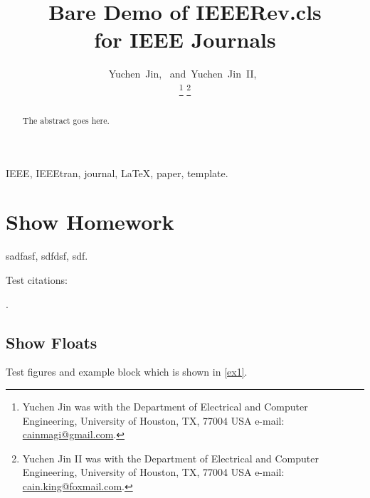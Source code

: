 \documentclass[mainfont=Palatino,color]{IEEERev} %
\title{Bare Demo of IEEERev.cls\\ for IEEE Journals}
\author{Yuchen~Jin,~\IEEEmembership{Member,~IEEE,}
  and~Yuchen~Jin~II,~\IEEEmembership{Member,~IEEE}%
  
  \thanks{Yuchen Jin was with the Department
    of Electrical and Computer Engineering, University of Houston, TX,
    77004 USA e-mail: \href{mailto:cainmagi@gmail.com}{cainmagi@gmail.com}.}%
  \thanks{Yuchen Jin II was with the Department
    of Electrical and Computer Engineering, University of Houston, TX,
    77004 USA e-mail: \href{mailto:cain.king@foxmail.com}{cain.king@foxmail.com}.}}
\begin{document}
	
\maketitle

\begin{abstract}
  The abstract goes here.
\end{abstract}

\begin{IEEEkeywords}
  IEEE, IEEEtran, journal, \LaTeX, paper, template.
\end{IEEEkeywords}

\section{Show Homework}
sadfasf, sdfdsf, sdf.

Test citations:

\cite{Zeiler5539957,Yang6175956,Dong7115171}.

\subsection{Show Floats}

Test figures and example block which is shown in \autoref{ex1}.
\end{document}
